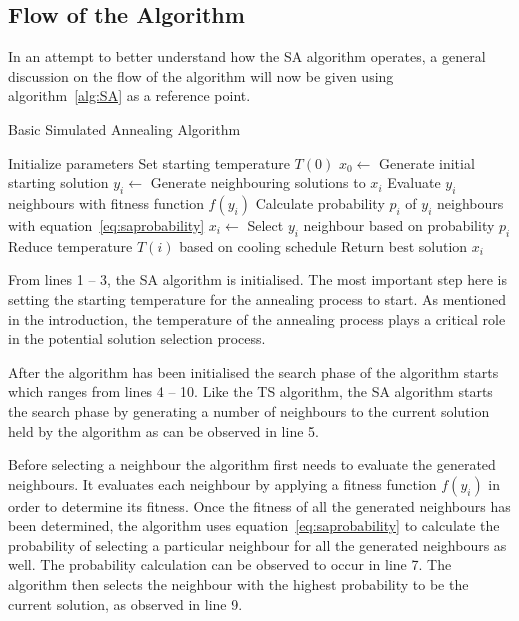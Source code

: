 \subsection{Flow of the Algorithm}
In an attempt to better understand how the SA algorithm operates, a general discussion on the flow of the algorithm will now be given using algorithm~\ref{alg:SA} as a reference point.
\begin{algorithm}[H]
\caption{Basic Simulated Annealing Algorithm\cite{VeryFastSAImageEnchancement,ChaosSA}}
\label{alg:SA}
	\begin{algorithmic}[1]
		\State Initialize parameters
		\State Set starting temperature $T(0)$
		\State $x_0 \leftarrow$ Generate initial starting solution
			\State $y_i \leftarrow$ Generate neighbouring solutions to $x_i$
			\State Evaluate $y_i$ neighbours with fitness function $f(y_i)$
			\State Calculate probability $p_i$ of $y_i$ neighbours with equation~\ref{eq:saprobability}
			\State $x_i \leftarrow$ Select $y_i$ neighbour based on probability $p_i$
			\State Reduce temperature $T(i)$ based on cooling schedule
		\EndWhile
		\State Return best solution $x_i$
	\end{algorithmic}
\end{algorithm}

From lines 1 -- 3, the SA algorithm is initialised. The most important step here is setting the starting temperature for the annealing process to start. As mentioned in the introduction, the temperature of the annealing process plays a critical role in the potential solution selection process.

After the algorithm has been initialised the search phase of the algorithm starts which ranges from lines 4 -- 10. Like the TS algorithm, the SA algorithm starts the search phase by generating a number of neighbours to the current solution held by the algorithm as can be observed in line 5.

Before selecting a neighbour the algorithm first needs to evaluate the generated neighbours. It evaluates each neighbour by applying a fitness function $f(y_i)$ in order to determine its fitness.
Once the fitness of all the generated neighbours has been determined, the algorithm uses equation~\ref{eq:saprobability} to calculate the probability of selecting a particular neighbour for all the generated neighbours as well. The probability calculation can be observed to occur in line 7. The algorithm then selects the neighbour with the highest probability to be the current solution, as observed in line 9. 

